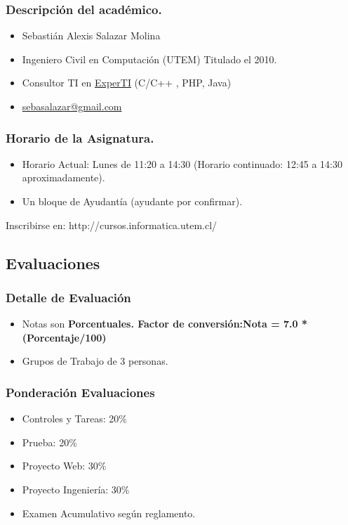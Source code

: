 \documentclass[12pt]{beamer}
\begin{document}
\begin{frame}
\frametitle{Descripción del académico.}
\begin{itemize}
 \item<2-> Sebastián Alexis Salazar Molina
 \item<3-> Ingeniero Civil en Computación (UTEM) Titulado el 2010.
 \item<4-> Consultor TI en \href{http://www.experti.cl}{ExperTI} (C/C++ , PHP, Java)
 \item<5-> \href{sebasalazar@gmail.com}{sebasalazar@gmail.com}
\end{itemize}

\end{frame}


\begin{frame}
 \frametitle{Horario de la Asignatura.}
 \begin{itemize}
  \item Horario Actual: Lunes de 11:20 a 14:30 (Horario continuado: 12:45 a 14:30 aproximadamente).
  \item Un bloque de Ayudantía (ayudante por confirmar).
 \end{itemize}
 Inscribirse en: http://cursos.informatica.utem.cl/
\end{frame}


\subsection{Evaluaciones}

\begin{frame}
 \frametitle{Detalle de Evaluación}
 \begin{itemize}
  \item Notas son \bf{Porcentuales}. Factor de conversión:\newline Nota = 7.0 * (Porcentaje/100)
  \item Grupos de Trabajo de \alert{3 personas}.
 \end{itemize}
\end{frame}

\begin{frame}
 \frametitle{Ponderación Evaluaciones}
 \begin{itemize}
  \item Controles y Tareas: 20\%
  \item Prueba: 20\%
  \item Proyecto Web: 30\%
  \item Proyecto Ingeniería: 30\%
  \item Examen Acumulativo según reglamento.
 \end{itemize}
\end{frame}
\end{document}
